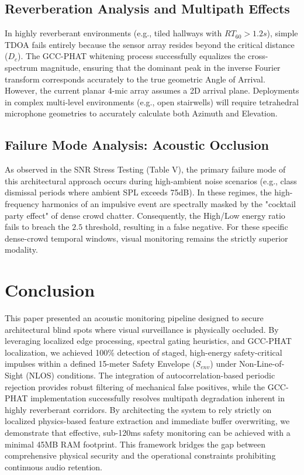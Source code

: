 \documentclass[conference]{IEEEtran}
\begin{document}
\subsection{Reverberation Analysis and Multipath Effects}
In highly reverberant environments (e.g., tiled hallways with $RT_{60} > 1.2s$), simple TDOA fails entirely because the sensor array resides beyond the critical distance ($D_c$). The GCC-PHAT whitening process successfully equalizes the cross-spectrum magnitude, ensuring that the dominant peak in the inverse Fourier transform corresponds accurately to the true geometric Angle of Arrival. However, the current planar 4-mic array assumes a 2D arrival plane. Deployments in complex multi-level environments (e.g., open stairwells) will require tetrahedral microphone geometries to accurately calculate both Azimuth and Elevation.

\subsection{Failure Mode Analysis: Acoustic Occlusion}
As observed in the SNR Stress Testing (Table V), the primary failure mode of this architectural approach occurs during high-ambient noise scenarios (e.g., class dismissal periods where ambient SPL exceeds 75dB). In these regimes, the high-frequency harmonics of an impulsive event are spectrally masked by the "cocktail party effect" of dense crowd chatter. Consequently, the High/Low energy ratio fails to breach the $2.5$ threshold, resulting in a false negative. For these specific dense-crowd temporal windows, visual monitoring remains the strictly superior modality.

\section{Conclusion}
This paper presented an acoustic monitoring pipeline designed to secure architectural blind spots where visual surveillance is physically occluded. By leveraging localized edge processing, spectral gating heuristics, and GCC-PHAT localization, we achieved 100\% detection of staged, high-energy safety-critical impulses within a defined 15-meter Safety Envelope ($S_{env}$) under Non-Line-of-Sight (NLOS) conditions. The integration of autocorrelation-based periodic rejection provides robust filtering of mechanical false positives, while the GCC-PHAT implementation successfully resolves multipath degradation inherent in highly reverberant corridors. By architecting the system to rely strictly on localized physics-based feature extraction and immediate buffer overwriting, we demonstrate that effective, sub-120ms safety monitoring can be achieved with a minimal 45MB RAM footprint. This framework bridges the gap between comprehensive physical security and the operational constraints prohibiting continuous audio retention.
\end{document}
